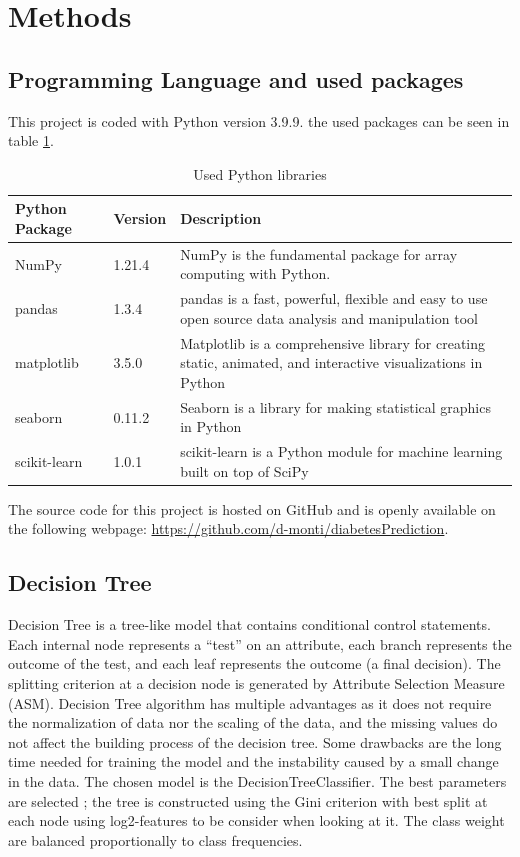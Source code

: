 \documentclass[11pt]{article}
\renewcommand{\arraystretch}{1.3}
\begin{document}
	\section{Methods}
	\subsection{Programming Language and used packages}
		This project is coded with Python version 3.9.9. the used packages can be seen in table \ref{tab:Python}.
	\begin{table}[H]
		\renewcommand{\arraystretch}{1.3}
		
		\centering
		\begin{tabularx}{\linewidth}{llX}
			Python Package & Version & Description \\
			\toprule
			NumPy \cite{numpy} & 1.21.4 & NumPy is the fundamental package for array computing with Python.\\
			pandas \cite{pandas} & 1.3.4 & pandas is a fast, powerful, flexible and easy to use open source data analysis and manipulation tool\\
			matplotlib \cite{matplotlib} & 3.5.0 & Matplotlib is a comprehensive library for creating static, animated, and interactive visualizations in Python\\
			seaborn \cite{seaborn} &  0.11.2 & Seaborn is a library for making statistical graphics in Python \\
			scikit-learn \cite{scikit} & 1.0.1  & scikit-learn is a Python module for machine learning built on top of SciPy \\

		\end{tabularx}
		\caption{Used Python libraries}
		\label{tab:Python}
	\end{table}
	The source code for this project is hosted on GitHub and is openly available on the following webpage: \url{https://github.com/d-monti/diabetesPrediction}.

	
	\subsection{Decision Tree}
	Decision Tree is a tree-like model that contains conditional control statements. Each internal node represents a “test” on an attribute, each branch represents the outcome of the test, and each leaf represents the outcome (a final decision). The splitting criterion at a decision node is generated by Attribute Selection Measure (ASM).
	\medbreak
	Decision Tree algorithm has multiple advantages as it does not require the normalization of data nor the scaling of the data, and the missing values do not affect the building process of the decision tree. Some drawbacks are the long time needed for training the model and the instability caused by a small change in the data.
	\medbreak
	The chosen model is the DecisionTreeClassifier. The best parameters are selected ; the tree is constructed using the Gini criterion with best split at each node using log2-features to be consider when looking at it. The class weight are balanced proportionally to class frequencies.
\end{document}
